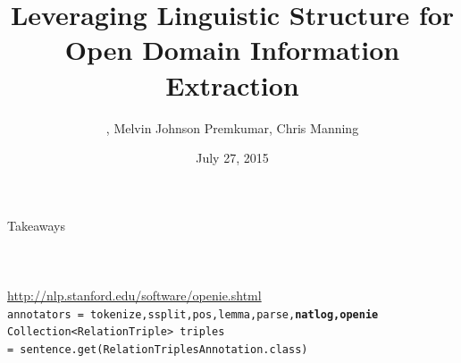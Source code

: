\documentclass[hyperref,xcolor=table]{beamer}
\title[Linguistics for Open IE]{Leveraging Linguistic Structure for Open Domain Information Extraction}
\subtitle{}
\author[Angeli, Premkumar, Manning]{\darkblue{Gabor Angeli}, Melvin Johnson Premkumar, Chris Manning}
\date{July 27, 2015}
\institute[Stanford]{Stanford University}
\begin{document}
\begin{frame}[noframenumbering]
  \titlepage
\end{frame}






\def\title{Takeaways}
\begin{frame}{\title}
 \\
\vspace{0.75cm}
 \\
\vspace{0.75cm}
 \\
\vspace{0.75cm}
 \\
\url{http://nlp.stanford.edu/software/openie.shtml} \\
\vspace{0.25cm}
\footnotesize{\texttt{annotators = tokenize,ssplit,pos,lemma,parse,\textbf{natlog,openie}}}
\footnotesize{\texttt{Collection<RelationTriple> triples}} \\
\footnotesize{\hspace{1cm}\texttt{= sentence.get(RelationTriplesAnnotation.class)}}

\end{frame}
\end{document}
